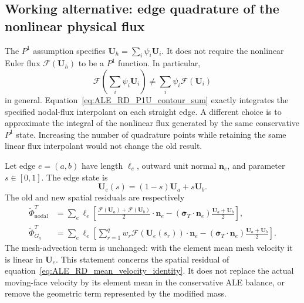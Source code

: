 \subsection{Working alternative: edge quadrature of the nonlinear physical flux}
\label{section:ALE_RD_Gauss_physical_flux}


The $P^1$ assumption specifies
$\mathbf U_h=\sum_i\psi_i\mathbf U_i$. It does not require the nonlinear
Euler flux $\boldsymbol{\mathcal F}(\mathbf U_h)$ to be a $P^1$ function.
In particular,
\begin{equation}
 \boldsymbol{\mathcal F}\left(\sum_i\psi_i\mathbf U_i\right)
 \ne \sum_i\psi_i\boldsymbol{\mathcal F}(\mathbf U_i)
 \label{eq:ALE_RD_Gauss_noncommutation}
\end{equation}
in general. Equation~\eqref{eq:ALE_RD_P1U_contour_sum} exactly integrates
the specified nodal-flux interpolant on each straight edge. A different
choice is to approximate the integral of the nonlinear flux generated by
the same conservative $P^1$ state. Increasing the number of quadrature
points while retaining the same linear flux interpolant would not change
the old result.

Let edge $e=(a,b)$ have length $\ell_e$, outward unit normal $\mathbf n_e$,
and parameter $s\in[0,1]$. The edge state is
\begin{equation}
 \mathbf U_e(s)=(1-s)\mathbf U_a+s\mathbf U_b.
\end{equation}
The old and new spatial residuals are respectively
\begin{align}
 \widetilde\Phi_{\mathrm{nodal}}^T
 &=\sum_e\ell_e\left[
 \frac{\boldsymbol{\mathcal F}(\mathbf U_a)+
       \boldsymbol{\mathcal F}(\mathbf U_b)}{2}\cdot\mathbf n_e
 -(\overline{\boldsymbol\sigma}_T\cdot\mathbf n_e)
        \frac{\mathbf U_a+\mathbf U_b}{2}\right],
 \label{eq:ALE_RD_Gauss_old_edge}\\
 \widetilde\Phi_{G_q}^T
 &=\sum_e\ell_e\left[
 \sum_{r=1}^q w_r\boldsymbol{\mathcal F}(\mathbf U_e(s_r))
          \cdot\mathbf n_e
 -(\overline{\boldsymbol\sigma}_T\cdot\mathbf n_e)
        \frac{\mathbf U_a+\mathbf U_b}{2}\right].
 \label{eq:ALE_RD_Gauss_new_edge}
\end{align}
The mesh-advection term is unchanged: with the element mean mesh velocity
it is linear in $\mathbf U_e$. This statement concerns the spatial residual
of equation~\eqref{eq:ALE_RD_mean_velocity_identity}. It does not replace
the actual moving-face velocity by its element mean in the conservative
ALE balance, or remove the geometric term represented by the modified mass.

